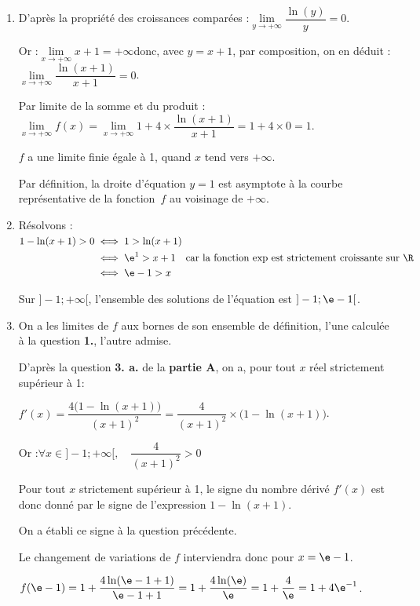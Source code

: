 	\begin{enumerate}
		\item D'après la propriété des croissances comparées :\quad $\lim\limits_{y \to +\infty} \dfrac{\ln(y)}{y} = 0$.

		Or :\quad $\lim\limits_{x \to +\infty} x+ 1 = + \infty$\quad donc, avec $y = x+1$, par composition, on en déduit :\quad $\lim\limits_{x \to +\infty} \dfrac{\ln(x+1)}{x+1} = 0$.

		Par limite de la somme et du produit :\quad $\lim\limits_{x \to +\infty} f(x) = \lim\limits_{x \to +\infty} 1 + 4\times \dfrac{\ln(x+1)}{x+1} = 1 + 4\times 0 = 1$.

		$f$ a une limite finie égale à 1, quand $x$ tend vers $+\infty$.

		Par définition, la droite d'équation \quad $y=1$ \quad est asymptote à la courbe représentative de la fonction~$f$ au voisinage de $+\infty$.

		\item Résolvons :\quad $\begin{aligned}[t]
			1-\ln (x+1)>0
				&\iff 1 > \ln(x+1)\\
				&\iff \e^{1} > x+1 \quad \text{car la fonction exp est strictement croissante sur }\R\\
				&\iff \e - 1 > x
		\end{aligned}$

		Sur $]-1 ;+\infty[$, l'ensemble des solutions de l'équation est $]-1 ; \e - 1[$.

		\item On a les limites de $f$ aux bornes de son ensemble de définition, l'une calculée à la question \textbf{1.}, l'autre admise.

		D'après la question \textbf{3. a.} de la \textbf{partie A}, on a, pour tout $x$ réel strictement supérieur à 1:

		$f'(x) = \dfrac{4\big(1 - \ln(x+1)\big)}{(x+1)^2} = \dfrac{4}{(x+1)^2} \times \big(1 - \ln(x+1)\big)$.

		Or :\quad $\forall x \in ]-1 ; +\infty[,\quad \dfrac{4}{(x+1)^2} > 0$

		Pour tout $x$ strictement supérieur à 1, le signe du nombre dérivé $f'(x)$ est donc donné par le signe de l'expression \quad$1 - \ln(x+1)$.

		On a établi ce signe à la question précédente.

		Le changement de variations de $f$ interviendra donc pour $x = \e - 1$.

		$f(\e - 1) = 1 + \dfrac{4\ln(\e - 1 + 1)}{\e - 1 + 1} = 1 + \dfrac{4\ln(\e)}{\e}= 1 + \dfrac{4}{\e} = 1 + 4\e^{-1}$.


\end{enumerate}
